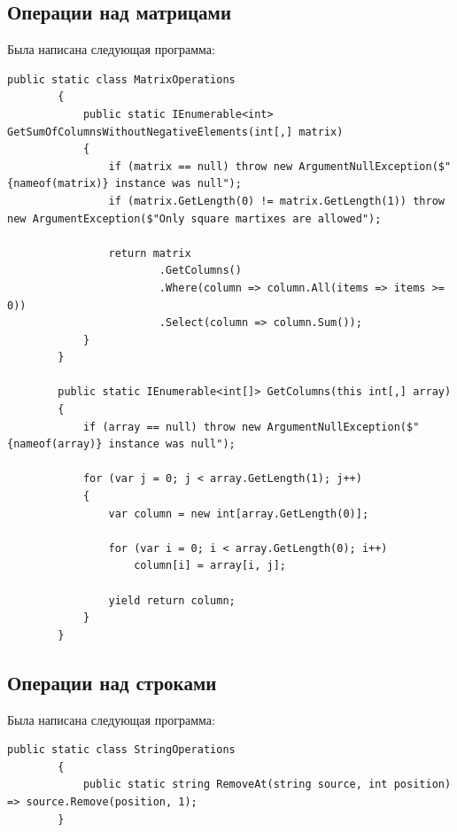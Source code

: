 \documentclass[a4paper,14pt]{extarticle}
\begin{document}
    \subsection{Операции над матрицами}
    Была написана следующая программа:
    \begin{lstlisting}[language={[Sharp]C}]
        public static class MatrixOperations
        {
            public static IEnumerable<int> GetSumOfColumnsWithoutNegativeElements(int[,] matrix)
            {
                if (matrix == null) throw new ArgumentNullException($"{nameof(matrix)} instance was null");
                if (matrix.GetLength(0) != matrix.GetLength(1)) throw new ArgumentException($"Only square martixes are allowed");

                return matrix
                        .GetColumns()
                        .Where(column => column.All(items => items >= 0))
                        .Select(column => column.Sum());
            }
        }

        public static IEnumerable<int[]> GetColumns(this int[,] array)
        {
            if (array == null) throw new ArgumentNullException($"{nameof(array)} instance was null");

            for (var j = 0; j < array.GetLength(1); j++)
            {
                var column = new int[array.GetLength(0)];

                for (var i = 0; i < array.GetLength(0); i++)
                    column[i] = array[i, j];

                yield return column;
            }
        }
    \end{lstlisting}

    \subsection{Операции над строками}
    Была написана следующая программа:
    \begin{lstlisting}[language={[Sharp]C}]
        public static class StringOperations
        {
            public static string RemoveAt(string source, int position) => source.Remove(position, 1);
        }
    \end{lstlisting}
\end{document}
